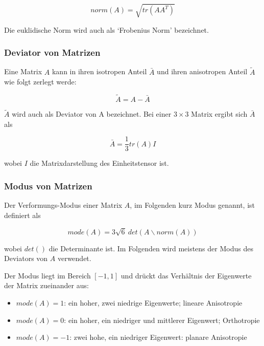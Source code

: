 \documentclass[a4paper,fontsize=12pt,toc=bib,halfparskip]{scrartcl}
\begin{document}
\begin{equation}
	norm(A) = \sqrt{tr(AA^T)}
\end{equation}

Die euklidische Norm wird auch als `Frobenius Norm' bezeichnet.

\subsubsection{Deviator von Matrizen}
Eine Matrix $A$ kann in ihren isotropen Anteil $\bar{A}$ und ihren anisotropen Anteil $\tilde{A}$ wie folgt zerlegt werde:

\begin{equation}
\tilde{A} = A - \bar{A}
\end{equation}

$\tilde{A}$ wird auch als Deviator von A bezeichnet. Bei einer $3\times 3$ Matrix ergibt sich $\bar{A}$ als

\begin{equation}
\bar{A} = \frac{1}{3}tr(A)I
\end{equation}

wobei $I$ die Matrixdarstellung des Einheitstensor ist.

\subsubsection{Modus von Matrizen}
Der Verformungs-Modus \cite{criscione2000invariant} einer Matrix $A$, im Folgenden kurz Modus genannt, ist definiert als

\begin{equation}
	mode(A) = 3\sqrt{6}~det(A\backslash norm(A))
\end{equation}

wobei $det()$ die Determinante ist. Im Folgenden wird meistens der Modus des Deviators von $A$ verwendet.

Der Modus liegt im Bereich $[-1,1]$ und dr\"uckt das Verh\"altnis der Eigenwerte der Matrix zueinander aus:

\begin{itemize}
	\item $mode(A) = 1$: ein hoher, zwei niedrige Eigenwerte; lineare Anisotropie
	\item $mode(A) = 0$: ein hoher, ein niedriger und mittlerer Eigenwert; Orthotropie
	\item $mode(A) = -1$: zwei hohe, ein niedriger Eigenwert: planare Anisotropie
\end{itemize} 
\end{document}
